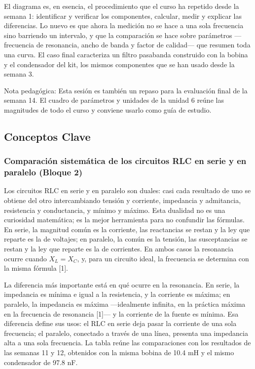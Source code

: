 \documentclass[11pt,letterpaper]{article}
\begin{document}
El diagrama es, en esencia, el procedimiento que el curso ha repetido desde la semana 1: identificar y verificar los componentes, calcular, medir y explicar las diferencias. Lo nuevo es que ahora la medición no se hace a una sola frecuencia sino barriendo un intervalo, y que la comparación se hace sobre parámetros ---frecuencia de resonancia, ancho de banda y factor de calidad--- que resumen toda una curva. El caso final caracteriza un filtro pasabanda construido con la bobina y el condensador del kit, los mismos componentes que se han usado desde la semana 3.

\begin{nota}{Nota pedagógica:}
Esta sesión es también un repaso para la evaluación final de la semana 14. El cuadro de parámetros y unidades de la unidad 6 reúne las magnitudes de todo el curso y conviene usarlo como guía de estudio.
\end{nota}

\subsection{Conceptos Clave}

\subsubsection{Comparación sistemática de los circuitos RLC en serie y en paralelo (Bloque 2)}

Los circuitos RLC en serie y en paralelo son duales: casi cada resultado de uno se obtiene del otro intercambiando tensión y corriente, impedancia y admitancia, resistencia y conductancia, y mínimo y máximo. Esta dualidad no es una curiosidad matemática; es la mejor herramienta para no confundir las fórmulas. En serie, la magnitud común es la corriente, las reactancias se restan y la ley que reparte es la de voltajes; en paralelo, la común es la tensión, las susceptancias se restan y la ley que reparte es la de corrientes. En ambos casos la resonancia ocurre cuando $X_L = X_C$, y, para un circuito ideal, la frecuencia se determina con la misma fórmula [1].

La diferencia más importante está en qué ocurre en la resonancia. En serie, la impedancia es mínima e igual a la resistencia, y la corriente es máxima; en paralelo, la impedancia es máxima ---idealmente infinita, en la práctica máxima en la frecuencia de resonancia [1]--- y la corriente de la fuente es mínima. Esa diferencia define sus usos: el RLC en serie deja pasar la corriente de una sola frecuencia; el paralelo, conectado a través de una línea, presenta una impedancia alta a una sola frecuencia. La tabla reúne las comparaciones con los resultados de las semanas 11 y 12, obtenidos con la misma bobina de 10.4 mH y el mismo condensador de 97.8 nF.
\end{document}

